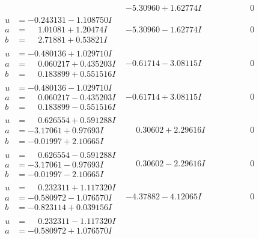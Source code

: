 \documentclass[1p]{elsarticle_modified}
\theoremstyle{definition}
\begin{document}
$$\begin{array}{c|c|c}
 & -5.30960 + 1.62774 I & \phantom{-0.000000 } 0 \\ \hline\begin{aligned}
u &= -0.243131 - 1.108750 I \\
a &= \phantom{-}1.01081 + 1.20474 I \\
b &= \phantom{-}2.71881 + 0.53821 I\end{aligned}
 & -5.30960 - 1.62774 I & \phantom{-0.000000 } 0 \\ \hline\begin{aligned}
u &= -0.480136 + 1.029710 I \\
a &= \phantom{-}0.060217 + 0.435203 I \\
b &= \phantom{-}0.183899 + 0.551516 I\end{aligned}
 & -0.61714 - 3.08115 I & \phantom{-0.000000 } 0 \\ \hline\begin{aligned}
u &= -0.480136 - 1.029710 I \\
a &= \phantom{-}0.060217 - 0.435203 I \\
b &= \phantom{-}0.183899 - 0.551516 I\end{aligned}
 & -0.61714 + 3.08115 I & \phantom{-0.000000 } 0 \\ \hline\begin{aligned}
u &= \phantom{-}0.626554 + 0.591288 I \\
a &= -3.17061 + 0.97693 I \\
b &= -0.01997 + 2.10665 I\end{aligned}
 & \phantom{-}0.30602 + 2.29616 I & \phantom{-0.000000 } 0 \\ \hline\begin{aligned}
u &= \phantom{-}0.626554 - 0.591288 I \\
a &= -3.17061 - 0.97693 I \\
b &= -0.01997 - 2.10665 I\end{aligned}
 & \phantom{-}0.30602 - 2.29616 I & \phantom{-0.000000 } 0 \\ \hline\begin{aligned}
u &= \phantom{-}0.232311 + 1.117320 I \\
a &= -0.580972 - 1.076570 I \\
b &= -0.823114 + 0.039156 I\end{aligned}
 & -4.37882 - 4.12065 I & \phantom{-0.000000 } 0 \\ \hline\begin{aligned}
u &= \phantom{-}0.232311 - 1.117320 I \\
a &= -0.580972 + 1.076570 I \\

\end{aligned}
\end{array}$$
\end{document}
